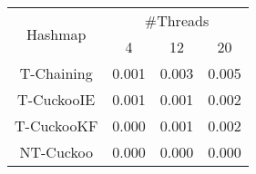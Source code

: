 \begin{tabular}{|c|c|c|c|}
\hline
\multirow{2}{*}{Hashmap} & \multicolumn{3}{c|}{\#Threads}\\\cline{2-4}& 4 & 12 & 20\\
\hline
\hline
T-Chaining & 0.001 & 0.003 & 0.005\\
T-CuckooIE & 0.001 & 0.001 & 0.002\\
T-CuckooKF & 0.000 & 0.001 & 0.002\\
NT-Cuckoo & 0.000 & 0.000 & 0.000\\
\hline
\end{tabular}
